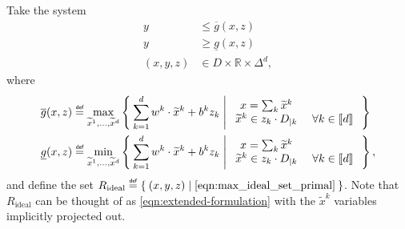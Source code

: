 \documentclass[smallextended]{svjour3}
\newcommand{\blue}[1]{{#1}}
\newcommand\defeq{\mathrel{\overset{\makebox[0pt]{\mbox{\normalfont\tiny\sffamily def}}}{=}}}
\newcommand{\tx}{\widetilde{x}}
\newcommand{\Rideal}{R_{\operatorname{ideal}}}
\newcommand{\ubar}[1]{\underline{#1}}
\renewcommand{\bar}[1]{\overline{#1}}
\begin{document}
Take the system
\begin{subequations}\label{eqn:max_ideal_set_primal}
\begin{align}
    y &\leq \bar{g}(x,z)\label{eqn:max_ideal_set_primal-1}\\
    y &\geq \ubar{g}(x,z)\label{eqn:max_ideal_set_primal-2}\\
    (x,y,z) &\in D \times \mathbb{R} \times \Delta^d,\label{eqn:max_ideal_set_primal-3}
\end{align}
\end{subequations}
where
\begin{align*}
    \bar{g}(x,z) \defeq \max_{\tx^1, \ldots, \tx^d}\Set{\sum_{k=1}^d w^k \cdot \tx^k + b^k z_k | \begin{array}{cc} x = \sum_k \tx^k & \\ \tx^k \in z_k \cdot D_{|k} &\ \forall k \in \llbracket d \rrbracket \end{array}}\hspace{0.45em}  \\
    \ubar{g}(x,z) \defeq \min_{\tx^1, \ldots, \tx^d}\Set{\sum_{k=1}^d w^k \cdot \tx^k + b^k z_k | \begin{array}{cc} x = \sum_k \tx^k & \\ \tx^k \in z_k \cdot D_{|k} &\ \forall k \in \llbracket d \rrbracket \end{array}},
\end{align*}
and define the set $\Rideal \defeq \Set{ (x,y,z) | \eqref{eqn:max_ideal_set_primal}}$. \blue{Note that $\Rideal$ can be thought of as \eqref{eqn:extended-formulation} with the $\tx^k$ variables implicitly projected out.}
\end{document}
